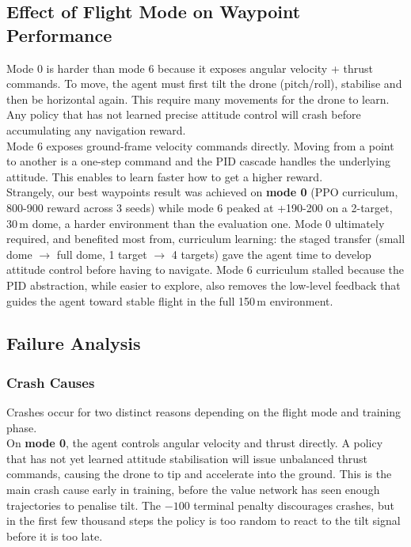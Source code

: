 \documentclass[11pt,a4paper]{article}
\begin{document}
\subsection{Effect of Flight Mode on Waypoint Performance}

Mode 0 is harder than mode 6 because it exposes angular velocity + thrust commands. To move, the agent must
first tilt the drone (pitch/roll), stabilise and then be horizontal again. This require many movements for the drone to learn. Any policy that has not learned precise attitude control will crash before accumulating any navigation reward. \\

Mode 6 exposes ground-frame velocity commands directly.  Moving from a point to another is a one-step command and the PID cascade handles the underlying attitude. This enables to learn faster how to get a higher reward. \\

Strangely, our best waypoints result was achieved on \textbf{mode 0} (PPO curriculum, 800-900 reward across 3 seeds) while mode 6 peaked at +190-200 on a 2-target, 30\,m dome, a harder environment than the evaluation one. Mode 0 ultimately required, and benefited most from, curriculum learning: the staged transfer (small dome $\to$ full dome, 1 target $\to$ 4 targets) gave the agent time to develop attitude control before having to navigate. Mode 6 curriculum stalled because the PID abstraction, while easier to explore, also removes the low-level feedback that guides the agent toward stable flight in the full 150\,m environment. \\

\subsection{Failure Analysis}

\subsubsection{Crash Causes}

Crashes occur for two distinct reasons depending on the flight mode and training phase. \\

On \textbf{mode 0}, the agent controls angular velocity and thrust directly. A policy that has not yet learned attitude stabilisation will issue unbalanced thrust commands, causing the drone to tip and accelerate into the ground. This is the main crash cause early in training, before the value network has seen enough trajectories to penalise tilt. The $-100$ terminal penalty discourages crashes, but in the first few thousand steps the policy is too random to react to the tilt signal before it is too late. \\
\end{document}
